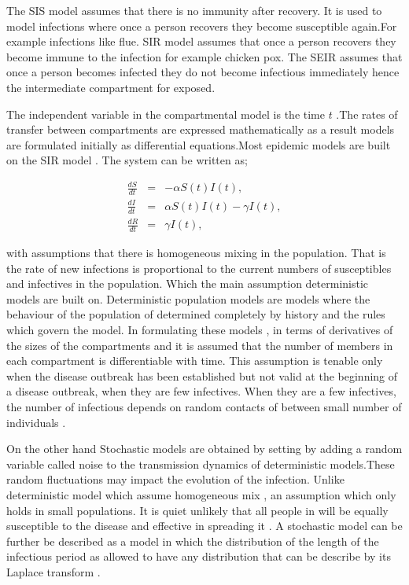 The SIS model assumes that there is no immunity after recovery. It is used to model infections where once a person recovers they become susceptible again.For example infections like flue. SIR model assumes that once a person recovers they become immune to the infection for example chicken pox. The SEIR assumes that once a person  becomes infected they do not  become infectious immediately hence the intermediate compartment for exposed. 


The independent variable in the compartmental model is the time $t$ .The rates of transfer between compartments are expressed mathematically as a result models are formulated initially as differential equations.Most epidemic models are built on the SIR model  \citep{m1925applications}. The system can be written as;


\begin{center}
\begin{equation} \label{eqn1_1}
\begin{array}{ccl}
\frac{dS}{dt} &= &-\alpha S(t) I(t),\\
 \frac{dI}{dt} &=& \alpha S(t) I(t) - \gamma  I(t), \\
 \frac{dR}{dt} &= &\gamma  I(t),
\end{array}  
\end{equation}
\end{center}



with assumptions that there is homogeneous mixing in the population. That is the rate of new infections is proportional to the current numbers of susceptibles and infectives in the population. Which the main assumption deterministic models are built on. Deterministic population  models are models where the behaviour of the population of determined completely by history and the rules which govern the model. In formulating these models , in terms of derivatives of the sizes of the compartments and it is assumed that the number of members in each compartment is differentiable with time. This assumption is tenable only when the disease outbreak has been established  but not valid at the beginning of a disease outbreak, when they are few infectives. When they are a few infectives, the number of infectious depends on random contacts of between small number of individuals \citep{brauer2012mathematical}.
 
 On the other hand Stochastic models are obtained by setting by adding a random variable called noise to the transmission dynamics of deterministic models.These random fluctuations may impact the evolution of the infection. Unlike deterministic model which assume homogeneous mix , an assumption which only holds in small populations. It is quiet unlikely that all people in will be equally susceptible to the disease and effective in spreading it \citep{ball1985deterministic}. A stochastic model can be further be described as a model in which the distribution of the length of the infectious period as allowed to have any distribution that can be describe by its Laplace transform \citep{addy1991generalized}.
 
